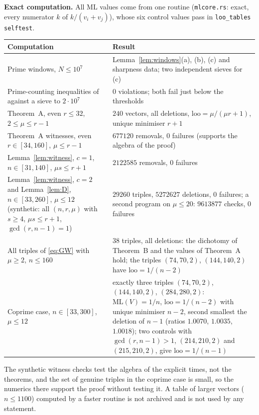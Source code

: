 \documentclass[11pt]{article}
\theoremstyle{remark}
\newcommand{\ML}{\mathrm{ML}}
\newcommand{\loo}{\mathrm{loo}}
\begin{document}
\textbf{Exact computation.} All $\ML$ values come from one routine (\texttt{mlcore.rs}: exact, every numerator $k$ of $k/(v_i+v_j)$), whose six control values pass in \texttt{loo\_tables selftest}.
\begin{center}\small
\begin{tabular}{@{}L{5.6cm}L{6.1cm}@{}}
\toprule
Computation & Result\\
\midrule
Prime windows, $N\le10^7$ & Lemma~\ref{lem:windows}(a), (b), (c) and sharpness data; two independent sieves for (c)\\
Prime-counting inequalities of \cite{Dusart10} against a sieve to $2\cdot10^7$ & $0$ violations; both fail just below the thresholds\\
Theorem~A, even $r\le32$, $2\le\mu\le r-1$ & $240$ vectors, all deletions, $\loo=\mu/(\mu r+1)$, unique minimiser $r+1$\\
Theorem~A witnesses, even $r\in[34,160]$, $\mu\le r-1$ & $677120$ removals, $0$ failures (supports the algebra of the proof)\\
Lemma~\ref{lem:witness}, $c=1$, $n\in[31,140]$, $\mu s\le r+1$ & $2122585$ removals, $0$ failures\\
Lemma~\ref{lem:witness}, $c=2$ and Lemma~\ref{lem:D}, $n\in[33,260]$, $\mu\le12$ (synthetic: all $(n,r,\mu)$ with $s\ge4$, $\mu s\le r+1$, $\gcd(r,n-1)=1$) & $29260$ triples, $5272627$ deletions, $0$ failures; a second program on $\mu\le20$: $9613877$ checks, $0$ failures\\
All triples of \eqref{eq:GW} with $\mu\ge2$, $n\le160$ & $38$ triples, all deletions: the dichotomy of Theorem~B and the values of Theorem~A hold; the triples $(74,70,2)$, $(144,140,2)$ have $\loo=1/(n-2)$\\
Coprime case, $n\in[33,300]$, $\mu\le12$ & exactly three triples $(74,70,2)$, $(144,140,2)$, $(284,280,2)$: $\ML(V)=1/n$, $\loo=1/(n-2)$ with unique minimiser $n-2$, second smallest the deletion of $n-1$ (ratios $1.0070$, $1.0035$, $1.0018$); two controls with $\gcd(r,n-1)>1$, $(214,210,2)$ and $(215,210,2)$, give $\loo=1/(n-1)$\\
\bottomrule
\end{tabular}
\end{center}
The synthetic witness checks test the algebra of the explicit times, not the theorems, and the set of genuine triples in the coprime case is small, so the numerics there support the proof without testing it. A table of larger vectors ($n\le1100$) computed by a faster routine is not archived and is not used by any statement.
\end{document}
